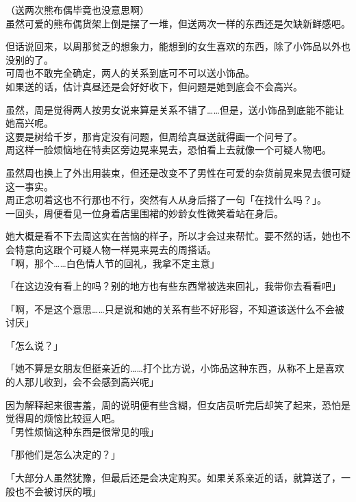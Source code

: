（送两次熊布偶毕竟也没意思啊）\\

虽然可爱的熊布偶货架上倒是摆了一堆，但送两次一样的东西还是欠缺新鲜感吧。

但话说回来，以周那贫乏的想象力，能想到的女生喜欢的东西，除了小饰品以外也没别的了。\\

可周也不敢完全确定，两人的关系到底可不可以送小饰品。\\

如果送的话，估计真昼还是会好好收下，但问题是她到底会不会高兴。

虽然，周是觉得两人按男女说来算是关系不错了……但是，送小饰品到底能不能让她高兴呢。\\

这要是树给千岁，那肯定没有问题，但周给真昼送就得画一个问号了。\\

周这样一脸烦恼地在特卖区旁边晃来晃去，恐怕看上去就像一个可疑人物吧。

虽然周也换上了外出用装束，但还是改变不了男性在可爱的杂货前晃来晃去很可疑这一事实。\\

周正念叨着这也不行那也不行，突然有人从身后搭了一句「在找什么吗？」。\\

一回头，周便看见一位身着店里围裙的妙龄女性微笑着站在身后。

她大概是看不下去周这实在苦恼的样子，所以才会过来帮忙。要不然的话，她也不会特意向这跟个可疑人物一样晃来晃去的周搭话。\\

「啊，那个……白色情人节的回礼，我拿不定主意」

「在这边没有看上的吗？别的地方也有些东西常被选来回礼，我带你去看看吧」

「啊，不是这个意思……只是说和她的关系有些不好形容，不知道该送什么不会被讨厌」

「怎么说？」

「她不算是女朋友但挺亲近的……打个比方说，小饰品这种东西，从称不上是喜欢的人那儿收到，会不会感到高兴呢」

因为解释起来很害羞，周的说明便有些含糊，但女店员听完后却笑了起来，恐怕是觉得周的烦恼比较逗人吧。\\

「男性烦恼这种东西是很常见的哦」

「那他们是怎么决定的？」

「大部分人虽然犹豫，但最后还是会决定购买。如果关系亲近的话，就算送了，一般也不会被讨厌的哦」\\

